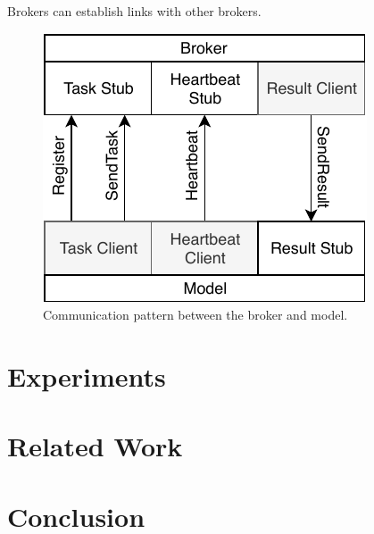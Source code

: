 \documentclass[conference]{IEEEtran}
\begin{document}
Brokers can establish links with other brokers.

\begin{figure}
  \centering
  \includegraphics{img/model_broker}
  \caption{Communication pattern between the broker and
    model.}\label{fig:broker-model}
\end{figure}

\section{Experiments}

\section{Related Work}

\section{Conclusion}



\end{document}
